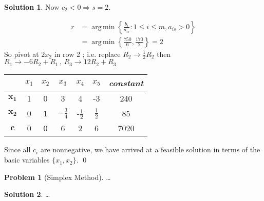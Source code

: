 \documentclass[11pt]{article}
\theoremstyle{plain}
\theoremstyle{definition}
\newtheorem{prob}{Problem}
\newtheorem*{soln*}{Solution}
\numberwithin{equation}{section}
\DeclareMathOperator*{\argmin}{arg\,min}
\begin{document}
\begin{soln*}
Now $c_2 < 0  \Rightarrow s = 2$.

\begin{align*}
    r &= \argmin \left\{ \frac{b_i}{a_{is}} : 1 \le i \le m , a_{is} > 0 \right\}\\
      &= \argmin \left\{ \frac{750}{6} , \frac{170}{2} \right\} = 2
\end{align*}
So pivot at $2x_2$ in row 2 ; i.e. replace $R_2 \to \frac{1}{2} R_2$ then
$R_1 \to -6R_2 + R_1 \,,\, R_3 \to 12R_2 + R_3 $

\begin{center}
\begin{tabu}{c|c|c|c|c|c|c}
    ~ & $x_1$ & $x_2$ & $x_3$ & $x_4$ & $x_5$ & \textit{constant} \\
    \hline
    $\bm{x_1}$ & 1 & 0 & 3 & 4 & -3 & 240 \\
    $\bm{x_2}$ & 0 & 1 & $-\frac{3}{4}$ & -$\frac{1}{2}$ & $\frac{1}{2}$ & 85 \\
    $\bm{c}$   & 0 & 0 & 6 & 2 & 6 & 7020
\end{tabu}
\end{center}
Since all $c_i$ are nonnegative, we have arrived at a feasible solution in terms of the basic variables
$\{x_1,x_2\}$.
\qed
\end{soln*}
\hrulefill %

\begin{prob}[Simplex Method]
    \dots
\end{prob}

\begin{soln*}
    \dots
\end{soln*}

\hrulefill
\end{document}
